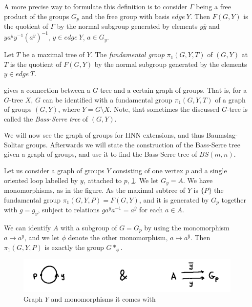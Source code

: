 A more precise way to formulate this definition is to consider $\Gamma$ being a free product of the groups $G_p$ and the free group with basis $edge \: Y$. Then $F(G,Y)$ is the quotient of $\Gamma$ by the normal subgroup generated by elements $y\overline{y}$ and $ya^yy^{-1}(a^{\overline{y}})^{-1}$, $y \in edge\:Y$, $a \in G_y$.

\begin{definition}
    Let $T$ be a maximal tree of $Y$. The \emph{fundamental group} $\pi_1(G,Y,T)$ of $(G,Y)$ at $T$ is the quotient of $F(G,Y)$ by the normal subgroup generated by the elements $y \in edge\:T$.
\end{definition}

\cite[section I.5.4]{Ser80} gives a connection between a $G$-tree and a certain graph of groups. That is, for a $G$-tree $X$, $G$ can be identified with a fundamental group $\pi_1(G,Y,T)$ of a graph of groups $(G,Y)$, where $Y = G\setminus X$.  Note, that sometimes the discussed $G$-tree is called the \emph{Bass-Serre tree} of $(G,Y)$.

We will now see the graph of groups for HNN extensions, and thus Baumslag-Solitar groups. Afterwards we will state the construction of the Bass-Serre tree given a graph of groups, and use it to find the Bass-Serre tree of $BS(m,n)$.


\begin{example}\cite[section I.5.1]{Ser80}\label{HNN graph}
    Let us consider a graph of groups $Y$ consisting of one vertex $p$ and a single oriented loop labelled by $y$, attached to $p$, \ref{loopHNN}. We let $G_y = A$. We have monomorphisms, as in the figure. As the maximal subtree of $Y$ is $\{P\}$ the fundamental group $\pi_1(G,Y,P) = F(G,Y)$, and it is generated by $G_p$ together with $g = g_y$, subject to relations $ga^ya^{-1} = a^{\overline{y}}$ for each $a \in A$.

    We can identify $A$ with a subgroup of $G = G_p$ by using the monomorphism $a \mapsto a^y$, and we let $\phi$ denote the other monomorphism, $a \mapsto a^{\overline{y}}$. Then $\pi_1(G,Y,P)$ is exactly the group $G \ast _\phi$.
\end{example}

\begin{figure}[h]
    \centering
    \includegraphics[width=0.5\linewidth]{sections/alicja/HNN loop and monomorphisms.jpeg}
    \caption{Graph $Y$ and monomorphisms it comes with}
    \label{loopHNN}
\end{figure}

